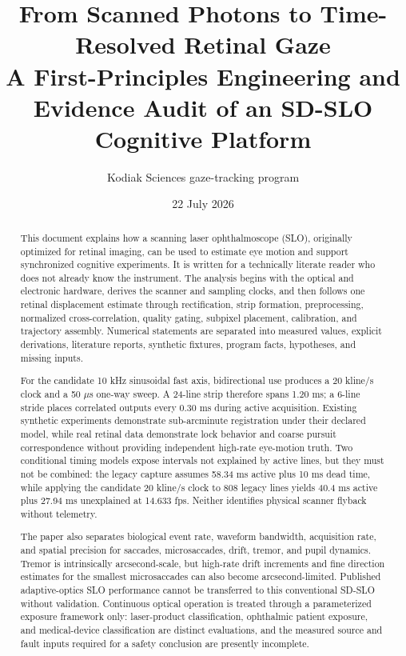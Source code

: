 \documentclass[11pt]{article}
\title{\textbf{From Scanned Photons to Time-Resolved Retinal Gaze}\\
\large A First-Principles Engineering and Evidence Audit of an SD-SLO Cognitive Platform}
\author{Kodiak Sciences gaze-tracking program}
\date{22 July 2026}
\begin{document}
\maketitle

\begin{abstract}
This document explains how a scanning laser ophthalmoscope (SLO), originally optimized for
retinal imaging, can be used to estimate eye motion and support synchronized cognitive experiments.
It is written for a technically literate reader who does not already know the instrument.
The analysis begins with the optical and electronic hardware, derives the scanner and sampling
clocks, and then follows one retinal displacement estimate through rectification, strip formation,
preprocessing, normalized cross-correlation, quality gating, subpixel placement, calibration,
and trajectory assembly. Numerical statements are separated into measured values, explicit
derivations, literature reports, synthetic fixtures, program facts, hypotheses, and missing inputs.

For the candidate 10 kHz sinusoidal fast axis, bidirectional use produces a 20 kline/s clock and a
50 $\mu$s one-way sweep. A 24-line strip therefore spans 1.20 ms; a 6-line stride places correlated
outputs every 0.30 ms during active acquisition. Existing synthetic experiments demonstrate
sub-arcminute registration under their declared model, while real retinal data demonstrate
lock behavior and coarse pursuit correspondence without providing independent high-rate eye-motion
truth. Two conditional timing models expose intervals not explained by active lines, but they must
not be combined: the legacy capture assumes 58.34 ms active plus 10 ms dead time, while applying the
candidate 20 kline/s clock to 808 legacy lines yields 40.4 ms active plus 27.94 ms unexplained at
14.633 fps. Neither identifies physical scanner flyback without telemetry.

The paper also separates biological event rate, waveform bandwidth, acquisition rate, and spatial
precision for saccades, microsaccades, drift, tremor, and pupil dynamics. Tremor is intrinsically
arcsecond-scale, but high-rate drift increments and fine direction estimates for the smallest
microsaccades can also become arcsecond-limited. Published adaptive-optics SLO performance cannot be
transferred to this conventional SD-SLO without validation. Continuous optical operation is treated
through a parameterized exposure framework only: laser-product classification, ophthalmic patient
exposure, and medical-device classification are distinct evaluations, and the measured source and
fault inputs required for a safety conclusion are presently incomplete.
\end{abstract}
\end{document}
